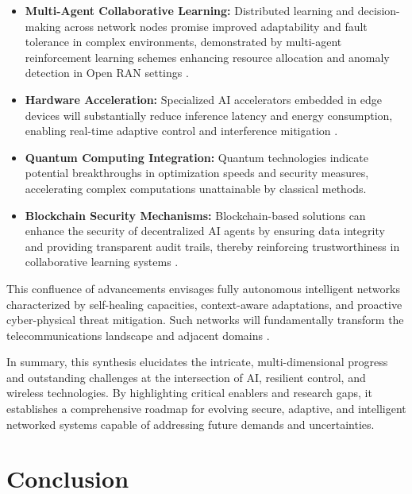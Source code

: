 \documentclass[sigconf]{acmart}
\begin{document}
\begin{itemize}
    \item \textbf{Multi-Agent Collaborative Learning:} Distributed learning and decision-making across network nodes promise improved adaptability and fault tolerance in complex environments, demonstrated by multi-agent reinforcement learning schemes enhancing resource allocation and anomaly detection in Open RAN settings \cite{ref49}.
    \item \textbf{Hardware Acceleration:} Specialized AI accelerators embedded in edge devices will substantially reduce inference latency and energy consumption, enabling real-time adaptive control and interference mitigation \cite{ref50}.
    \item \textbf{Quantum Computing Integration:} Quantum technologies indicate potential breakthroughs in optimization speeds and security measures, accelerating complex computations unattainable by classical methods.
    \item \textbf{Blockchain Security Mechanisms:} Blockchain-based solutions can enhance the security of decentralized AI agents by ensuring data integrity and providing transparent audit trails, thereby reinforcing trustworthiness in collaborative learning systems \cite{ref54}.
\end{itemize}

This confluence of advancements envisages fully autonomous intelligent networks characterized by self-healing capacities, context-aware adaptations, and proactive cyber-physical threat mitigation. Such networks will fundamentally transform the telecommunications landscape and adjacent domains \cite{ref55}.

\bigskip

In summary, this synthesis elucidates the intricate, multi-dimensional progress and outstanding challenges at the intersection of AI, resilient control, and wireless technologies. By highlighting critical enablers and research gaps, it establishes a comprehensive roadmap for evolving secure, adaptive, and intelligent networked systems capable of addressing future demands and uncertainties.

\section{Conclusion}
\end{document}
